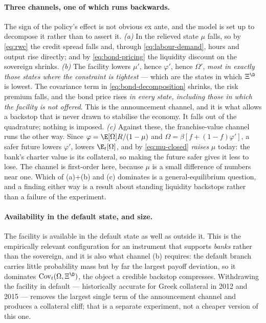 \paragraph{Three channels, one of which runs backwards.} The sign of the policy's
effect is not obvious ex ante, and the model is set up to decompose it rather than
to assert it. \emph{(a)} In the relieved state $\mu$ falls, so by \eqref{eq:rwc}
the credit spread falls and, through \eqref{eq:labour-demand}, hours and output
rise directly; and by \eqref{eq:bond-pricing} the liquidity discount on the
sovereign shrinks. \emph{(b)} The facility lowers $\mu'$, hence $\varphi'$, hence
$\Omega'$, \emph{most in exactly those states where the constraint is tightest} ---
which are the states in which $\Xi^{\D}$ is lowest. The covariance term in
\eqref{eq:bond-decomposition} shrinks, the risk premium falls, and the bond price
rises \emph{in every state, including those in which the facility is not offered}.
This is the announcement channel, and it is what allows a backstop that is never
drawn to stabilise the economy. It falls out of the quadrature; nothing is
imposed. \emph{(c)} Against these, the franchise-value channel runs the other way.
Since $\varphi=\E[\Omega]R/(1-\mu)$ and $\Omega=\beta[f+(1-f)\varphi']$, a safer
future lowers $\varphi'$, lowers $\E_t[\Omega]$, and by \eqref{eq:mu-closed}
\emph{raises} $\mu$ today: the bank's charter value is its collateral, so making
the future safer gives it less to lose. The channel is first-order here, because
$\mu$ is a small difference of numbers near one. Which of (a)+(b) and (c)
dominates is a general-equilibrium question, and a finding either way is a
result about standing liquidity backstops rather than a failure of the
experiment.

\paragraph{Availability in the default state, and size.} The facility is
available in the default state as well as outside it. This is the empirically
relevant configuration for an instrument that supports \emph{banks} rather than
the sovereign, and it is also what channel (b) requires: the default branch
carries little probability mass but by far the largest payoff deviation, so it
dominates $\mathrm{Cov}_t(\Omega,\Xi^{\D})$, the object a credible backstop
compresses. Withdrawing the facility in default --- historically accurate for
Greek collateral in 2012 and 2015 --- removes the largest single term of the
announcement channel and produces a collateral cliff; that is a separate
experiment, not a cheaper version of this one.

